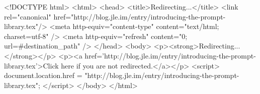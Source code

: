 <!DOCTYPE html>
<html>
<head>
<title>Redirecting...</title>
<link rel="canonical" href="http://blog.jle.im/entry/introducing-the-prompt-library.tex"/>
<meta http-equiv="content-type" content="text/html; charset=utf-8" />
<meta http-equiv="refresh" content="0; url=#{destination_path}" />
</head>
<body>
  <p><strong>Redirecting...</strong></p>
  <p><a href='http://blog.jle.im/entry/introducing-the-prompt-library.tex'>Click here if you are not redirected.</a></p>
  <script>
    document.location.href = "http://blog.jle.im/entry/introducing-the-prompt-library.tex";
  </script>
</body>
</html>
